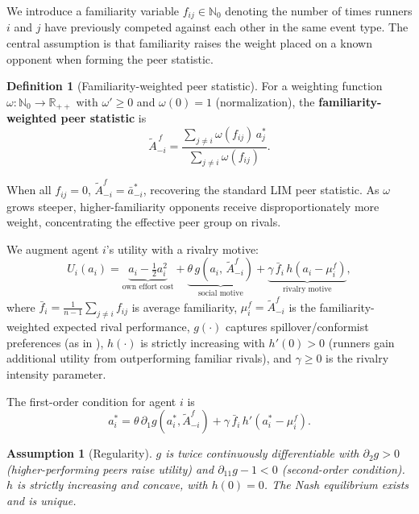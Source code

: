 \documentclass[12pt]{article}
\newtheorem{assumption}{Assumption}
\theoremstyle{definition}
\newtheorem{definition}{Definition}
\theoremstyle{remark}
\begin{document}
We introduce a familiarity variable $f_{ij} \in \mathbb{N}_0$ denoting the
number of times runners $i$ and $j$ have previously competed against each other
in the same event type.
The central assumption is that familiarity raises the weight placed on a known
opponent when forming the peer statistic.

\begin{definition}[Familiarity-weighted peer statistic]
For a weighting function $\omega:\mathbb{N}_0\to\mathbb{R}_{++}$ with
$\omega' \ge 0$ and $\omega(0) = 1$ (normalization), the
\textbf{familiarity-weighted peer statistic} is
\begin{equation}
\tilde{A}_{-i}^{\,f} = \frac{\sum_{j\neq i}\omega(f_{ij})\,a_j^*}{\sum_{j\neq i}\omega(f_{ij})}.
\label{eq:fam_stat}
\end{equation}
\end{definition}

When all $f_{ij}=0$, $\tilde{A}_{-i}^f = \bar{a}_{-i}^*$, recovering the
standard LIM peer statistic.
As $\omega$ grows steeper, higher-familiarity opponents receive disproportionately
more weight, concentrating the effective peer group on rivals.

We augment agent $i$'s utility with a rivalry motive:
\begin{equation}
U_i(a_i) = \underbrace{a_i - \tfrac{1}{2}a_i^2}_{\text{own effort cost}} +
\underbrace{\theta\,g\!\left(a_i,\, \tilde{A}_{-i}^f\right)}_{\text{social motive}} +
\underbrace{\gamma\,\bar{f}_i\,h\!\left(a_i - \mu_i^f\right)}_{\text{rivalry motive}},
\label{eq:utility}
\end{equation}
where $\bar{f}_i = \frac{1}{n-1}\sum_{j\neq i}f_{ij}$ is average familiarity,
$\mu_i^f = \tilde{A}_{-i}^f$ is the familiarity-weighted expected rival performance,
$g(\cdot)$ captures spillover/conformist preferences (as in \citealt{Boucher2024}),
$h(\cdot)$ is strictly increasing with $h'(0) > 0$ (runners gain additional
utility from outperforming familiar rivals), and $\gamma \ge 0$ is the
rivalry intensity parameter.

The first-order condition for agent $i$ is
\begin{equation}
a_i^* = \theta\,\partial_1 g\!\left(a_i^*, \tilde{A}_{-i}^f\right) +
\gamma\,\bar{f}_i\,h'\!\left(a_i^* - \mu_i^f\right).
\label{eq:FOC}
\end{equation}

\begin{assumption}[Regularity]
\label{ass:regularity}
$g$ is twice continuously differentiable with $\partial_2 g > 0$ (higher-performing
peers raise utility) and $\partial_{11}g - 1 < 0$ (second-order condition).
$h$ is strictly increasing and concave, with $h(0) = 0$.
The Nash equilibrium exists and is unique.
\end{assumption}
\end{document}

